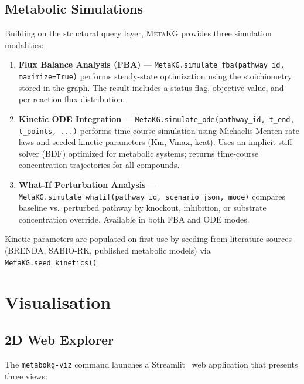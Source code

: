 \documentclass[10pt]{article}
\begin{document}
\subsection{Metabolic Simulations}

Building on the structural query layer, \textsc{MetaKG} provides three simulation
modalities:

\begin{enumerate}[leftmargin=*,itemsep=2pt]
  \item \textbf{Flux Balance Analysis (FBA)} ---
    \texttt{MetaKG.simulate\_fba(pathway\_id, maximize=True)} performs
    steady-state optimization using the stoichiometry stored in the graph.
    The result includes a status flag, objective value, and per-reaction flux
    distribution.

  \item \textbf{Kinetic ODE Integration} ---
    \texttt{MetaKG.simulate\_ode(pathway\_id, t\_end, t\_points, ...)}
    performs time-course simulation using Michaelis-Menten rate laws and
    seeded kinetic parameters (Km, Vmax, kcat). Uses an implicit stiff solver
    (BDF) optimized for metabolic systems; returns time-course concentration
    trajectories for all compounds.

  \item \textbf{What-If Perturbation Analysis} ---
    \texttt{MetaKG.simulate\_whatif(pathway\_id, scenario\_json, mode)}
    compares baseline vs.\ perturbed pathway by knockout, inhibition, or
    substrate concentration override. Available in both FBA and ODE modes.
\end{enumerate}

Kinetic parameters are populated on first use by seeding from literature
sources (BRENDA, SABIO-RK, published metabolic models) via
\texttt{MetaKG.seed\_kinetics()}.

\section{Visualisation}
\label{sec:viz}

\subsection{2D Web Explorer}

The \texttt{metabokg-viz} command launches a Streamlit~\citep{streamlit2019}
web application that presents three views:
\end{document}

